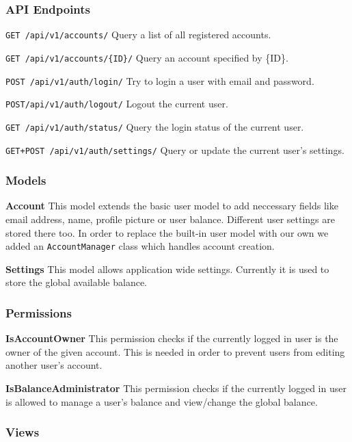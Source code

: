 \subsubsection{API Endpoints}\label{api-endpoints}

\texttt{GET\ /api/v1/accounts/} Query a list of all registered accounts.

\texttt{GET\ /api/v1/accounts/\{ID\}/} Query an account specified by
\{ID\}.

\texttt{POST\ /api/v1/auth/login/} Try to login a user with email and
password.

\texttt{POST/api/v1/auth/logout/} Logout the current user.

\texttt{GET\ /api/v1/auth/status/} Query the login status of the current
user.

\texttt{GET+POST\ /api/v1/auth/settings/} Query or update the current
user's settings.

\subsubsection{Models}\label{models-2}

\textbf{Account} This model extends the basic user model to add
neccessary fields like email address, name, profile picture or user
balance. Different user settings are stored there too. In order to
replace the built-in user model with our own we added an
\texttt{AccountManager} class which handles account creation.

\textbf{Settings} This model allows application wide settings. Currently
it is used to store the global available balance.

\subsubsection{Permissions}\label{permissions-1}

\textbf{IsAccountOwner} This permission checks if the currently logged
in user is the owner of the given account. This is needed in order to
prevent users from editing another user's account.

\textbf{IsBalanceAdministrator} This permission checks if the currently
logged in user is allowed to manage a user's balance and view/change the
global balance.

\subsubsection{Views}\label{views-2}

